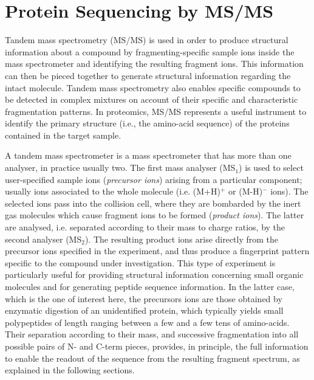\chapter{Protein Sequencing by MS/MS}
\nopagebreak
\label{chap:msms}

Tandem mass spectrometry (MS/MS) is used in order to produce structural information about
a compound by fragmenting-specific sample ions inside the mass spectrometer and
identifying the resulting fragment ions.
This information can then be pieced together to generate structural information
regarding the intact molecule. 
Tandem mass spectrometry also enables specific compounds to be detected in
complex mixtures on account of their specific and characteristic fragmentation
patterns.
In proteomics, MS/MS represents a useful instrument to identify 
the primary structure (i.e., the amino-acid sequence) of the proteins
contained in  the target sample.

A tandem mass spectrometer is a mass spectrometer that has more than one
analyser, in practice usually two.
The first mass analyser (MS$_1$) is used to select user-specified sample ions (\emph{precursor
ions}) arising from a particular component; usually ions associated to the whole molecule 
(i.e. (M+H)$^+$ or (M-H)$^-$ ions).
The selected ions pass into the collision cell, where they are bombarded by the
inert gas molecules which cause fragment ions to be formed (\emph{product ions}).
The latter are analysed, i.e. separated according to their mass to charge
ratios, by the second analyser (MS$_2$).
The resulting product ions arise directly from the precursor ions specified in the
experiment, and thus produce a fingerprint pattern specific to the compound
under investigation.
This type of experiment is particularly useful for providing structural
information concerning small organic molecules and for generating peptide
sequence information.
In the latter case, which is the one of interest here, 
the precursors ions are those obtained by enzymatic digestion of an
unidentified protein, which typically yields small polypeptides of length ranging
between a few and a few tens of amino-acids. Their separation according to their
mass, and successive fragmentation into all possible pairs of N- and C-term
pieces, provides, in principle, the full information to enable the readout of
the sequence from the resulting fragment spectrum, as explained in the following sections.

